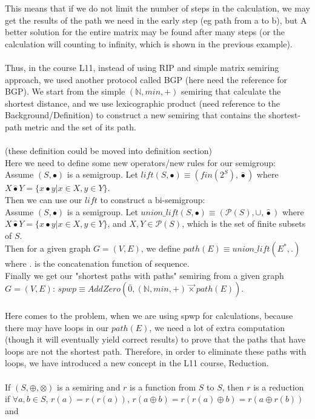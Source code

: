 \documentclass[a4paper,10pt]{article}
\begin{document}
This means that if we do not limit the number of steps in the calculation, we may get the results of the path we need in the early step (eg path from a to b), but A better solution for the entire matrix may be found after many steps (or the calculation will counting to infinity, which is shown in the previous example).\\\\
Thus, in the course L11, instead of using RIP and simple matrix semiring approach, we used another protocol called BGP (here need the reference for BGP). We start from the simple $(\mathbb{N},min,+)$ semiring that calculate the shortest distance, and we use lexicographic product (need reference to the Background/Definition) to construct a new semiring that contains the shortest-path metric and the set of its path.\\\\
(these definition could be moved into definition section)\\
Here we need to define some new operators/new rules for our semigroup:\\
Assume $(S,\bullet)$ is a semigroup. Let $lift(S,\bullet)\equiv (fin(2^S),\hat\bullet)$ where
$X \hat\bullet Y = \{x\bullet y |x\in X,y\in Y\}$.\\
Then we can use our $lift$ to construct a bi-semigroup:\\
Assume $(S,\bullet)$ is a semigroup. Let $union\_lift(S,\bullet)\equiv (\mathcal{P}(S),\cup,\hat\bullet)$ where
$X \hat\bullet Y = \{x\bullet y |x\in X,y\in Y\}$, and $X,Y \in \mathcal{P}(S)$, which is the set of finite subsets of $S$.\\
Then for a given graph $G = (V,E)$, we define $path(E)\equiv union\_lift(E^*,.)$ where . is the concatenation function of sequence.\\
Finally we get our "shortest paths with paths" semiring from a given graph $G = (V,E)$: $spwp \equiv AddZero(\bar0,(\mathbb{N},min,+) \overrightarrow{\times} path(E))$.\\\\
Here comes to the problem, when we are using spwp for calculations, because there may have loops in our $path(E)$, we need a lot of extra computation (though it will eventually yield correct results) to prove that the paths that have loops are not the shortest path.
Therefore, in order to eliminate these paths with loops, we have introduced a new concept in the L11 course, Reduction.\\\\
If $(S,\oplus,\otimes)$ is a semiring and $r$ is a function from $S$ to $S$, then $r$ is a reduction if $\forall a,b \in S$, $r(a) = r(r(a))$, $r(a\oplus b) = r(r(a)\oplus b) = r(a\oplus r(b))$ and 
\end{document}
